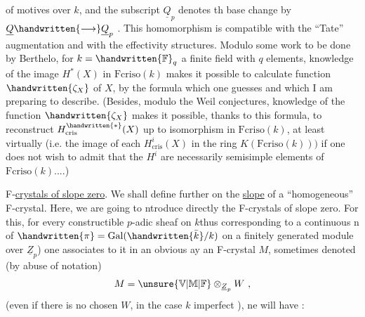
of motives  over $k$, and the subscript $\underline{Q}_p$ denotes th  base change by $\underline{Q}\handwritten{\longrightarrow}\underline{Q}_p$ . This homomorphism is compatible with the ``Tate'' augmentation and with the effectivity structures. Modulo some work to be done by Berthelo, for $k=\handwritten{\mathbb{F}}_q$ a finite field with $q$ elements, knowledge of the image  $H^*(X)$ in $\mathrm{Fcriso}(k)$ makes it possible to calculate  function $\handwritten{\zeta_X}$ of $X$, by the formula which one guesses and which I am preparing to describe. (Besides, modulo the Weil conjectures, knowledge of the function $\handwritten{\zeta_X}$ makes it possible, thanks to this formula, to reconstruct $H^{\handwritten{*}}_{\mathrm{cris}}(X)$ up to isomorphism in $\mathrm{Fcriso}(k)$, at least virtually (i.e. the image of each $H^i_{\mathrm{cris}}(X)$ in the ring $K(\mathrm{Fcriso}(k)))$ if one does not wish to admit that  the $H^i$ are necessarily semisimple elements of $\mathrm{Fcriso}(k)$....)

 F-\uline{crystals of  slope zero}. We shall define further on the \uline{slope} of a ``homogeneous'' F-crystal. Here, we are going to ntroduce directly the F-crystals of slope zero. For this, for every constructible $p$-adic sheaf  on $k$\handwritten{(}thus corresponding to a continuous n of $\handwritten{\pi}=\operatorname{Gal}(\handwritten{\bar{k}}/k)$ on a finitely generated module over $\underline{Z}_p$) one associates to it in an obvious ay an F-crystal $M$, sometimes denoted (by abuse of notation)
\[
M=\unsure{\mathbb{V}|\mathbb{M}|\mathbb{F}}\otimes_{\underline{Z}_p}W\ ,
\]
(even if there is no chosen $W$, in the case $k$ imperfect \handwritten{!} ), ne will have :

